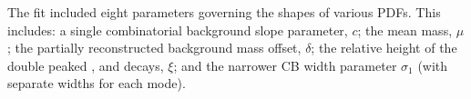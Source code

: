 


The fit included eight parameters governing the shapes of various PDFs.
This includes: a single combinatorial background slope parameter, $c$; the mean \Bp mass, $\mu$; the partially reconstructed background mass offset, $\delta$; the relative height of the double peaked \decay{\Bp}{\Dssp\phiz}, \decay{\Bp}{\Dssp\Dzb} and \decay{\Bp}{\Dsp\Dstarzb} decays, $\xi$; and the narrower CB width parameter $\sigma_{1}$ (with separate widths for each \Dsp mode). 

